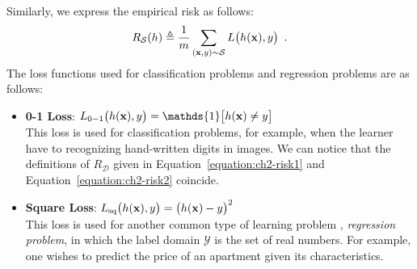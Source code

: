 Similarly, we express the empirical risk as follows:
\begin{equation}
  R_{\mathcal{S}}(h) \triangleq \frac{1}{m} \sum_{(\mathbf{x}, y) \sim \mathcal{S}} L\big( h(\mathbf{x}), y \big) \enspace.
\end{equation}
The loss functions used for classification problems and regression problems are as follows: 
\begin{itemize}
  \item \textbf{0-1 Loss}: $L_{0-1}\big( h(\xvec), y \big) = \mathds{1}\big[ h(\xvec) \neq y \big]$ \\
  This loss is used for classification problems, for example, when the learner have to recognizing hand-written digits in images.
  We can notice that the definitions of $R_{\mathcal{D}}$ given in Equation~\ref{equation:ch2-risk1} and Equation~\ref{equation:ch2-risk2} coincide.
  \item \textbf{Square Loss}: $L_{\text{sq}} \big( h(\mathbf{x}), y \big) = \big( h(\mathbf{x}) - y \big)^2$ \\	
  This loss is used for another common type of learning problem \ie, \emph{regression problem}, in which the label domain $\mathcal{Y}$ is the set of real numbers.
  For example, one wishes to predict the price of an apartment given its characteristics.
\end{itemize}


